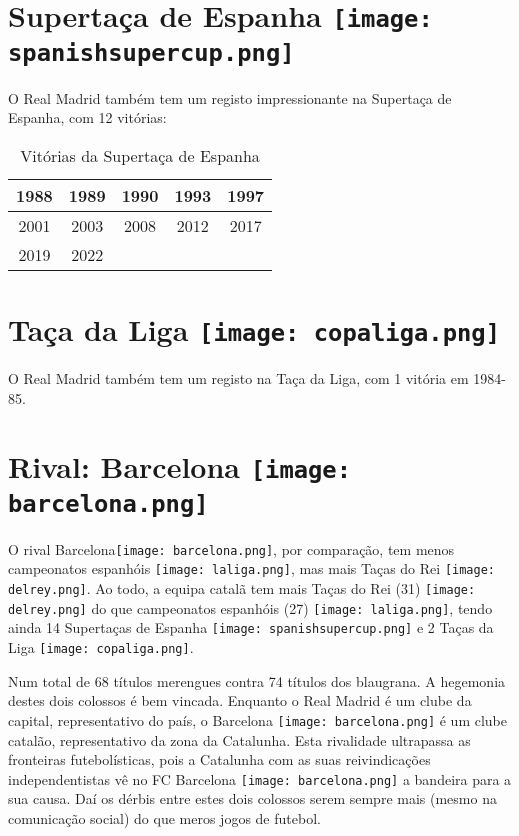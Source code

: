 \documentclass{report}
\begin{document}
\section{Supertaça de Espanha \protect\texttt{[image: spanishsupercup.png]}}
O Real Madrid também tem um registo impressionante na Supertaça de Espanha, com 12 vitórias:
\begin{table}[h]
    \centering
    \begin{tabular}{|c|c|c|c|c|}
    \hline
    1988 & 1989 & 1990 & 1993 & 1997 \\ \hline
    2001 & 2003 & 2008 & 2012 & 2017 \\ \hline
    2019 & 2022 & & & \\ \hline
    \end{tabular}
    \caption{Vitórias da Supertaça de Espanha}
    \label{tab:vitorias}
\end{table}

\section{Taça da Liga \protect\texttt{[image: copaliga.png]}}
O Real Madrid também tem um registo na Taça da Liga, com 1 vitória em 1984-85.

\section{Rival: Barcelona \protect\texttt{[image: barcelona.png]}}
O rival Barcelona\texttt{[image: barcelona.png]}, por comparação, tem menos campeonatos espanhóis \protect\texttt{[image: laliga.png]}, mas mais Taças do Rei \protect\texttt{[image: delrey.png]}. Ao todo, a equipa catalã tem mais Taças do Rei (31) \protect\texttt{[image: delrey.png]} do que campeonatos espanhóis (27) \protect\texttt{[image: laliga.png]}, tendo ainda 14 Supertaças de Espanha \texttt{[image: spanishsupercup.png]} e 2 Taças da Liga \texttt{[image: copaliga.png]}. 

Num total de 68 títulos merengues contra 74 títulos dos blaugrana. A hegemonia destes dois colossos é bem vincada. Enquanto o Real Madrid é um clube da capital, representativo do país, o Barcelona \texttt{[image: barcelona.png]} é um clube catalão, representativo da zona da Catalunha. Esta rivalidade ultrapassa as fronteiras futebolísticas, pois a Catalunha com as suas reivindicações independentistas vê no FC Barcelona \texttt{[image: barcelona.png]} a bandeira para a sua causa. Daí os dérbis entre estes dois colossos serem sempre mais (mesmo na comunicação social) do que meros jogos de futebol.
\end{document}
